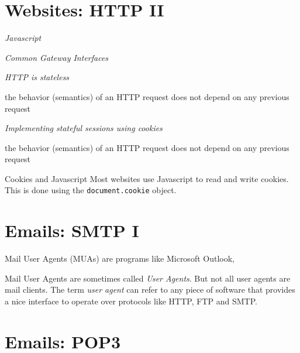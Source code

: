 \section{Websites: HTTP II}


\frmrule 

\textit{Javascript}

\frmrule 

\textit{Common Gateway Interfaces}

\frmrule 

\textit{HTTP is stateless}

the behavior (semantics) of an HTTP request does not depend on
any previous request

\frmrule 

\textit{Implementing stateful sessions using cookies}

the behavior (semantics) of an HTTP request does not depend on
any previous request


\begin{sidenote}{Cookies and Javascript}
Most websites use Javascript to read and write cookies.
This is done using the \lstinline{document.cookie} object.
\end{sidenote}




\section{Emails: SMTP I}

Mail User Agents (MUAs) are programs like Microsoft Outlook, 


Mail User Agents are sometimes called \textit{User Agents}. 
But not all user agents are mail clients. 
The term \textit{user agent} can refer to any 
piece of software that provides a nice interface to operate 
over protocols like HTTP, FTP and SMTP. 

\section{Emails: POP3}